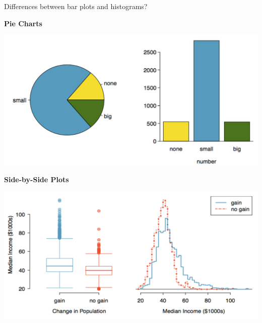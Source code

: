 \documentclass[11pt,letterpaper,twoside]{article}
\begin{document}
Differences between bar plots and histograms?

\newpage

{\bf Pie Charts}

\begin{center}
\includegraphics[scale=0.7]{images/pie.png}
\end{center}

{\bf Side-by-Side Plots}

\begin{center}
\includegraphics[scale=0.8]{images/sidebyside.png}
\end{center}

\label{totalpag}
\end{document}
